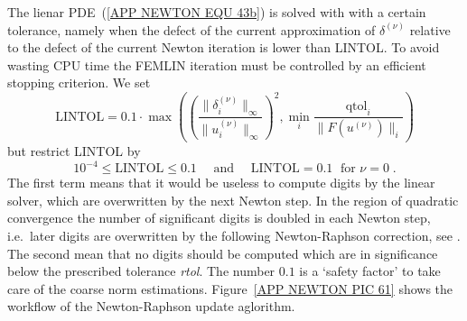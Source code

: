 The lienar PDE~(\ref{APP NEWTON EQU 43b}) is solved with with a certain tolerance, namely when
the defect of the current
approximation of $\delta^{(\nu)}$ relative to the defect of
the current Newton iteration is lower than {LINTOL}.  To avoid
wasting CPU time the FEMLIN iteration must be controlled by an
efficient stopping criterion.  We set
\begin{equation}
  \mbox{LINTOL} = 0.1 \cdot \max ( \left( \frac{\|\delta^{(\nu)}_i\|_{\infty}}{\|u_i^{(\nu)}\|_{\infty}} \right)^2 
,\min_{i} \frac{\mbox{qtol}_i}{\|F(u^{(\nu)})\|_{i}} )
\end{equation}
but restrict {LINTOL} by
\begin{equation}
       10^{-4} \le \mbox{LINTOL} \le 0.1 \quad \mbox{ and } \quad
             \mbox{LINTOL}=0.1 \; \mbox{ for }\nu=0  \;.
\end{equation}
The first term means that it would be useless to compute digits by the
linear solver, which are overwritten by the next Newton step.  In the
region of quadratic convergence the number of significant digits is
doubled in each Newton step, i.e.~later digits are overwritten by the
following Newton-Raphson correction, see \cite{Schoenauer1981a}.  The second 
mean that no digits should be computed which are in significance
below the prescribed tolerance {\it rtol}.  The number $0.1$ is a `safety factor' to take care
of the coarse norm estimations. Figure~\ref{APP NEWTON PIC 61} shows the workflow of
the Newton-Raphson update aglorithm.

